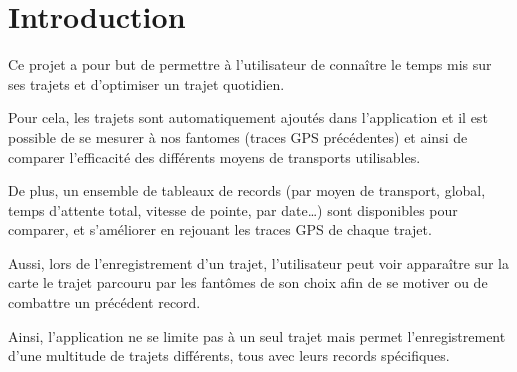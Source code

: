\chapter{Introduction}


Ce projet a pour but de permettre à l’utilisateur de connaître le temps mis sur ses trajets et d’optimiser un trajet quotidien.

Pour cela, les trajets sont automatiquement ajoutés dans l’application et il est possible de se mesurer à nos \glspl{fantome} (traces GPS précédentes) et ainsi de comparer l'efficacité des différents moyens de transports utilisables.

De plus, un ensemble de tableaux de records (par moyen de transport, global, temps d’attente total, vitesse de pointe, par date…) sont disponibles pour comparer, et s’améliorer en rejouant les traces GPS de chaque trajet.

Aussi, lors de l’enregistrement d’un trajet, l’utilisateur peut voir apparaître sur la carte le trajet parcouru par les fantômes de son choix afin de se motiver ou de combattre un précédent record.

Ainsi, l’application ne se limite pas à un seul trajet mais permet l’enregistrement d’une multitude de trajets différents, tous avec leurs records spécifiques.
